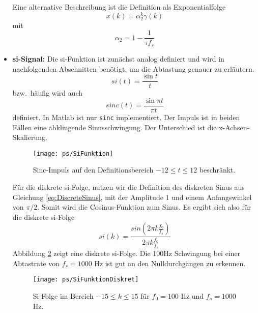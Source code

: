 \begin{itemize}
{    Eine alternative Beschreibung ist die Definition als Exponentialfolge
    \[
        x(k) = \alpha_2^{k} \gamma(k)
    \]
    mit
    \[
        \alpha_2 = 1-\frac{1}{\tau f_s}
    \]
    
    }
    \item{{\bf si-Signal:} Die si-Funktion ist zunächst analog definiert und wird in
    nachfolgenden Abschnitten
    benötigt, um \zB die Abtastung genauer zu erläutern.
    \begin{equation}
    si(t) = \frac{\sin t}{t}
    \end{equation}
    bzw.\ häufig wird auch
   \begin{equation}
    sinc(t) = \frac{\sin \pi t}{\pi t}
    \end{equation}
    definiert. In Matlab ist nur \verb/sinc/ implementiert.
    Der Impuls ist in beiden Fällen eine abklingende Sinusschwingung. Der Unterschied ist die
    x-Achsen-Skalierung.
    \begin{figure}[H]
    \begin{center}
    \texttt{[image: ps/SiFunktion]}
    \caption{\label{pic:SiFunktion} Sinc-Impuls auf den Definitionsbereich $-12 \leq t \leq 12$ beschränkt.}
    \end{center}
    \end{figure}
    Für die diskrete si-Folge, nutzen wir die Definition des diskreten Sinus
    aus Gleichung \ref{eq:DiscreteSinus}, mit der Amplitude 1 und einem Anfangswinkel von $\pi/2$.
    Somit wird die Cosinus-Funktion zum Sinus. Es ergibt sich also für die diskrete si-Folge
    \begin{equation}\label{eq:DEF:DiscreteSi}
        si(k) = \frac{sin \left(2\pi k\frac{f_0}{f_s} \right)}{2\pi k\frac{f_0}{f_s}}
    \end{equation}
    Abbildung \ref{pic:SiFunktionDiskret} zeigt eine diskrete si-Folge. Die 100Hz Schwingung
    bei einer Abtastrate von $f_s = 1000$ Hz ist gut an den Nulldurchgängen zu erkennen.
    \begin{figure}[H]
    \begin{center}
    \texttt{[image: ps/SiFunktionDiskret]}
    \caption{\label{pic:SiFunktionDiskret} Si-Folge im Bereich $-15 \leq k \leq 15$ für $f_0 = 100$ Hz und
    $f_s = 1000$ Hz.}
    \end{center}
    \end{figure}

}
\end{itemize}

